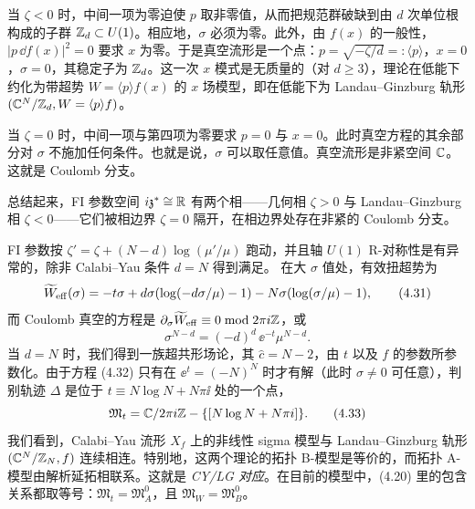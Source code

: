 当 $\zeta<0$ 时，中间一项为零迫使 $p$ 取非零值，从而把规范群破缺到由 $d$ 次单位根构成的子群 $\mathbb{Z}_d\subset U(1)$。相应地，$\sigma$ 必须为零。此外，由 $f(x)$ 的一般性，$|p\,\dd f(x)|^2=0$ 要求 $x$ 为零。于是真空流形是一个点：$p=\sqrt{-\zeta/d}=:\langle p\rangle$，$x=0$，$\sigma=0$，其稳定子为 $\mathbb{Z}_d$。这一次 $x$ 模式是无质量的（对 $d\ge3$），理论在低能下约化为带超势 $W=\langle p\rangle f(x)$ 的 $x$ 场模型，即在低能下为 Landau--Ginzburg 轨形 $(\mathbb{C}^N/\mathbb{Z}_d,W=\langle p\rangle f)$。

当 $\zeta=0$ 时，中间一项与第四项为零要求 $p=0$ 与 $x=0$。此时真空方程的其余部分对 $\sigma$ 不施加任何条件。也就是说，$\sigma$ 可以取任意值。真空流形是非紧空间 $\mathbb{C}$。这就是 Coulomb 分支。

总结起来，FI 参数空间 $i\mathfrak{z}^*\cong\mathbb{R}$ 有两个相——几何相 $\zeta>0$ 与 Landau--Ginzburg 相 $\zeta<0$——它们被相边界 $\zeta=0$ 隔开，在相边界处存在非紧的 Coulomb 分支。

FI 参数按 $\zeta'=\zeta+(N-d)\log(\mu'/\mu)$ 跑动，并且轴 $U(1)$ R-对称性是有异常的，除非 Calabi--Yau 条件 $d=N$ 得到满足。
在大 $\sigma$ 值处，有效扭超势为
\begin{equation}
    \widetilde{W}_{\mathrm{eff}}(\sigma) = -t\sigma + d\sigma(\log(-d\sigma/\mu)-1) - N\sigma(\log(\sigma/\mu)-1), \tag{4.31}
\end{equation}
而 Coulomb 真空的方程是 $\partial_\sigma\widetilde{W}_{\mathrm{eff}}\equiv 0 \bmod 2\pi i\mathbb{Z}$，或
\begin{equation}
    \sigma^{N-d} = (-d)^d\,\ee^{-t}\mu^{N-d}. \tag{4.32}
\end{equation}
当 $d=N$ 时，我们得到一族超共形场论，其 $\hat c=N-2$，由 $t$ 以及 $f$ 的参数所参数化。由于方程 (4.32) 只有在 $\ee^t=(-N)^N$ 时才有解（此时 $\sigma\neq0$ 可任意），判别轨迹 $\Delta$ 是位于 $t\equiv N\log N+N\pi\ii$ 处的一个点，
\begin{equation}
    \mathfrak{M}_t = \mathbb{C}/2\pi i\mathbb{Z} - \{[N\log N + N\pi i]\}. \tag{4.33}
\end{equation}
我们看到，Calabi--Yau 流形 $X_f$ 上的非线性 sigma 模型与 Landau--Ginzburg 轨形 $(\mathbb{C}^N/\mathbb{Z}_N,f)$ 连续相连。特别地，这两个理论的拓扑 B-模型是等价的，而拓扑 A-模型由解析延拓相联系。这就是 \emph{CY/LG 对应}。在目前的模型中，(4.20) 里的包含关系都取等号：$\mathfrak{M}_t=\mathfrak{M}_A^0$，且 $\mathfrak{M}_W=\mathfrak{M}_B^0$。

